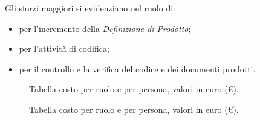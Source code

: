 Gli sforzi maggiori si evidenziano nel ruolo di:
\begin{itemize}
\item {\PJx} per l'incremento della \emph{Definizione di Prodotto};
\item {\PGx} per l'attività di codifica;
\item {\Vx} per il controllo e la verifica del codice e dei documenti prodotti.
\end{itemize}

\begin{figure}[H]
\label{tab:cpdc}

  \caption{Tabella costo {\PDC} per ruolo e per persona, valori in euro (\euro).}
\end{figure}
\begin{figure}[H]
\label{tab:cpdc}

  \caption{Tabella costo {\PDC} per ruolo e per persona, valori in euro (\euro).}
\end{figure}

